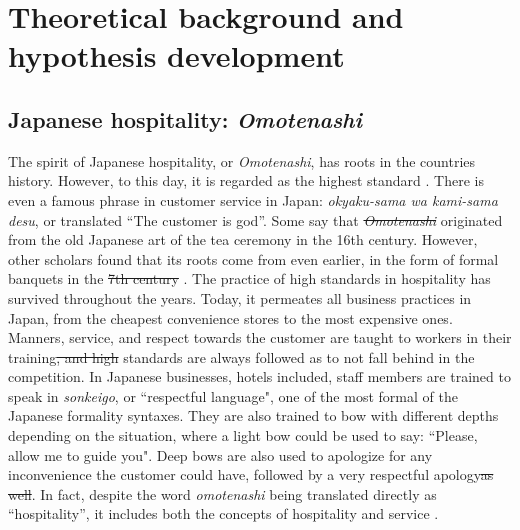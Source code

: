 \documentclass[smallextended,natbib]{svjour3}       %
\providecommand{\DIFadd}[1]{{\protect\color{blue}\uwave{#1}}} %
\providecommand{\DIFdel}[1]{{\protect\color{red}\sout{#1}}}                      %
\providecommand{\DIFaddbegin}{} %
\providecommand{\DIFaddend}{} %
\providecommand{\DIFdelbegin}{} %
\providecommand{\DIFdelend}{} %
\begin{document}
\section{Theoretical background and hypothesis development}\label{theory_hypothesis}

  \subsection{Japanese hospitality: \textit{Omotenashi}}\label{theory_omotenashi}

    The spirit of Japanese hospitality, or \textit{Omotenashi}, has roots in the countries history. However, to this day, it is regarded as the highest standard \DIFdelbegin %
\DIFdelend \DIFaddbegin \cite[][]{ikeda2013omotenashi, al2015characteristics}\DIFaddend . There is even a famous phrase in customer service in Japan: \textit{okyaku-sama wa kami-sama desu}, or translated ``The customer is god''. Some say that \textit{\DIFdelbegin \DIFdel{Omotenashi}\DIFdelend \DIFaddbegin \DIFadd{omotenashi}\DIFaddend } originated from the old Japanese art of the tea ceremony in the 16th century. However, other scholars found that its roots come from even earlier, in the form of formal banquets in the \DIFdelbegin \DIFdel{7th century }%
\DIFdelend \DIFaddbegin \DIFadd{7th-century }\cite[][]{aishima2015origin}\DIFaddend . The practice of high standards in hospitality has survived throughout the years. Today, it permeates all business practices in Japan, from the cheapest convenience stores to the most expensive ones. Manners, service, and respect towards the customer are taught to workers in their training\DIFdelbegin \DIFdel{, and high }\DIFdelend \DIFaddbegin \DIFadd{. High }\DIFaddend standards are always followed as to not fall behind in the competition. In Japanese businesses, hotels included, staff members are trained to speak in \textit{sonkeigo}, or ``respectful language", one of the most formal of the Japanese formality syntaxes. They are also trained to bow with different depths depending on the situation, where a light bow could be used to say: ``Please, allow me to guide you". Deep bows are also used to apologize for any inconvenience the customer could have, followed by a very respectful apology\DIFdelbegin \DIFdel{as well}\DIFdelend . In fact, despite the word \textit{omotenashi} being translated directly as ``hospitality'', it includes both the concepts of hospitality and service \DIFdelbegin %
\DIFdelend \DIFaddbegin \cite[][]{Kuboyama2020}\DIFaddend . 
\end{document}
